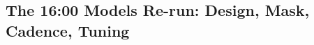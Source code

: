 

\newsavebox{\campbox}
\newcommand{\campfit}[1]{%
  \sbox{\campbox}{#1}%
  \ifdim\wd\campbox>\textwidth
    \resizebox{\textwidth}{!}{\usebox{\campbox}}%
  \else
    \usebox{\campbox}%
  \fi}

\subsection{The 16:00 Models Re-run: Design, Mask, Cadence, Tuning}
\label{sec:app_campaign_16h}


